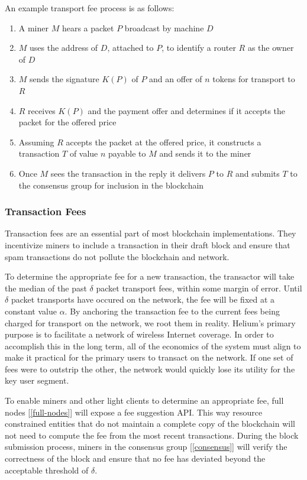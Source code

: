 \documentclass[10pt, nonatbib, nocopyrightspace, reprint]{sigplanconf}
\newcommand{\secref}[1]{[\autoref{#1}]}
\begin{document}
An example transport fee process is as follows:

\begin{enumerate}
  \item A miner $M$ hears a packet $P$ broadcast by machine $D$
  \item $M$ uses the address of $D$, attached to $P$, to identify a router $R$ as the owner of $D$
  \item $M$ sends the signature $K(P)$ of $P$ and an offer of $n$ tokens for transport to $R$
  \item $R$ receives $K(P)$ and the payment offer and determines if it accepts the packet for the offered price
  \item Assuming $R$ accepts the packet at the offered price, it constructs a transaction $T$ of value $n$ payable to $M$ and sends it to the miner
  \item Once $M$ sees the transaction in the reply it delivers $P$ to $R$ and submits $T$ to the consensus group for inclusion in the blockchain
\end{enumerate}

\subsubsection{Transaction Fees} \label{fees}

Transaction fees are an essential part of most blockchain implementations. They incentivize miners to include a transaction in their draft block and ensure that spam transactions do not pollute the blockchain and network.

To determine the appropriate fee for a new transaction, the transactor will take the median of the past $\delta$ packet transport fees, within some margin of error. Until $\delta$ packet transports have occured on the network, the fee will be fixed at a constant value $\alpha$. By anchoring the transaction fee to the current fees being charged for transport on the network, we root them in reality. Helium's primary purpose is to facilitate a network of wireless Internet coverage. In order to accomplish this in the long term, all of the economics of the system must align to make it practical for the primary users to transact on the network. If one set of fees were to outstrip the other, the network would quickly lose its utility for the key user segment.

To enable miners and other light clients to determine an appropriate fee, full nodes \secref{full-nodes} will expose a fee suggestion API. This way resource constrained entities that do not maintain a complete copy of the blockchain will not need to compute the fee from the most recent transactions. During the block submission process, miners in the consensus group \secref{consensus} will verify the correctness of the block and ensure that no fee has deviated beyond the acceptable threshold of $\delta$.
\end{document}
